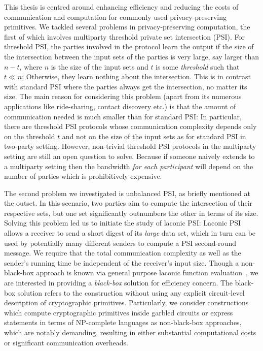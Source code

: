 This thesis is centred around enhancing efficiency and reducing the costs of communication and computation for commonly used privacy-preserving primitives.
We tackled several problems in privacy-preserving computation, the first of which involves multiparty threshold private set intersection (PSI).
For threshold PSI, the parties involved in the protocol learn the output if the size of the intersection between the input sets of the parties is very large, say larger than $n-t$, where $n$ is the size of the input sets and $t$ is some \emph{threshold} such that $t\ll n$; Otherwise, they learn nothing about the intersection. This is in contrast with standard PSI where the parties always get the intersection, no matter its size.
The main reason for considering this problem (apart from its numerous applications like ride-sharing, contact discovery etc.) is that the amount of communication needed is much smaller than for standard PSI: In particular, there are threshold PSI protocols whose communication complexity depends only on the threshold $t$ and not on the size of the input sets as for standard PSI \cite{C:GhoSim19} in two-party setting. 
However, non-trivial threshold PSI protocols in the multiparty setting are still an open question to solve. Because if someone naively extends \cite{C:GhoSim19} to a multiparty setting then the bandwidth \emph{for each participant} will depend on the number of parties which is prohibitively expensive.

The second problem we investigated is unbalanced PSI, as briefly mentioned at the outset. In this scenario, two parties aim to compute the intersection of their respective sets, but one set significantly outnumbers the other in terms of its size. Solving this problem led us to initiate the study of laconic PSI: Laconic PSI allows a receiver to send a short digest of its \emph{large} data set, which in turn can be used by potentially many different senders to compute a PSI second-round message. We require  that the total communication complexity as well as the sender's running time be independent of the receiver's input size. Though a non-black-box approach is known via general purpose laconic function evaluation~\cite{FOCS:QuaWeeWic18}, we are interested in providing a \emph{black-box} solution for efficiency concern.
The black-box solution refers to the construction without using any explicit circuit-level description of cryptographic primitives. Particularly, we consider constructions which compute cryptographic primitives inside garbled circuits or express statements in terms of NP-complete languages as non-black-box approaches, which are notably demanding, resulting in either substantial computational costs or significant communication overheads.

